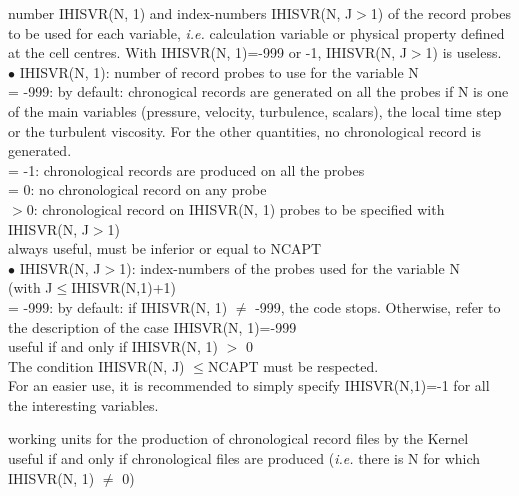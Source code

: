 {number IHISVR(N, 1) and index-numbers IHISVR(N, J$>$1) of the record
probes to be used for each variable, {\em i.e.} calculation variable
or physical property defined at the cell centres.
With IHISVR(N, 1)=-999 or -1, IHISVR(N, J$>$1) is useless.\\
\hspace*{.5cm} $\bullet$ IHISVR(N, 1): number of record probes to use
for the variable N\\ 
\hspace*{1.3cm}= -999: by default: chronogical records are generated on
all the probes if N is one of the main variables (pressure, velocity,
turbulence, scalars), the local time step or the turbulent
viscosity. For the other quantities, no chronological record is generated.\\
\hspace*{1.3cm}= -1: chronological records are produced on all the probes\\
\hspace*{1.3cm}= 0: no chronological record on any probe\\
\hspace*{1.3cm}$>0$: chronological record on IHISVR(N, 1) probes to be specified
with  IHISVR(N, J$>$1)\\
always useful, must be inferior or equal to NCAPT\\
\hspace*{.5cm} $\bullet$ IHISVR(N, J$>$1): index-numbers of the probes
used for the variable N\\ 
(with J$\leqslant$IHISVR(N,1)+1)\\
\hspace*{1.3cm}= -999: by default: if IHISVR(N, 1) $\ne$
-999, the  code stops. Otherwise, refer to the description of the case
IHISVR(N, 1)=-999\\ 
useful if and only if IHISVR(N, 1) $>$ 0 \\
The condition IHISVR(N, J) $\leqslant$NCAPT must be respected.\\
For an easier use, it is recommended to simply specify IHISVR(N,1)=-1 for
all the interesting variables.}

{working units for the production of chronological record files by the Kernel\\
useful if and only if chronological files are produced ({\em i.e.} there
is N for which IHISVR(N, 1) $\ne$ 0)}

